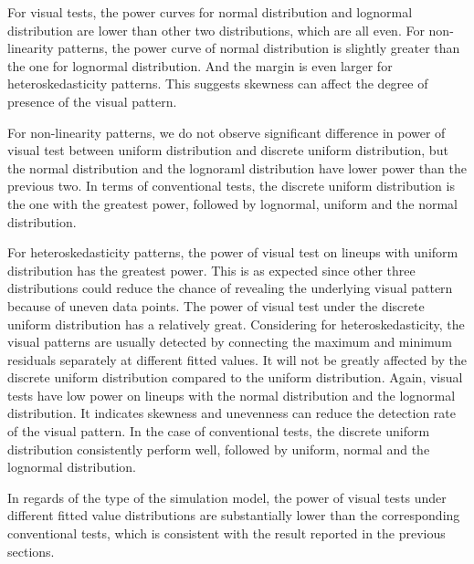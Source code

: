 \documentclass[]{interact}
\theoremstyle{plain}%
\theoremstyle{definition}
\theoremstyle{remark}
\begin{document}
For visual tests, the power curves for normal distribution and lognormal
distribution are lower than other two distributions, which are all even.
For non-linearity patterns, the power curve of normal distribution is
slightly greater than the one for lognormal distribution. And the margin
is even larger for heteroskedasticity patterns. This suggests skewness
can affect the degree of presence of the visual pattern.

For non-linearity patterns, we do not observe significant difference in
power of visual test between uniform distribution and discrete uniform
distribution, but the normal distribution and the lognoraml distribution
have lower power than the previous two. In terms of conventional tests,
the discrete uniform distribution is the one with the greatest power,
followed by lognormal, uniform and the normal distribution.

For heteroskedasticity patterns, the power of visual test on lineups
with uniform distribution has the greatest power. This is as expected
since other three distributions could reduce the chance of revealing the
underlying visual pattern because of uneven data points. The power of
visual test under the discrete uniform distribution has a relatively
great. Considering for heteroskedasticity, the visual patterns are
usually detected by connecting the maximum and minimum residuals
separately at different fitted values. It will not be greatly affected
by the discrete uniform distribution compared to the uniform
distribution. Again, visual tests have low power on lineups with the
normal distribution and the lognormal distribution. It indicates
skewness and unevenness can reduce the detection rate of the visual
pattern. In the case of conventional tests, the discrete uniform
distribution consistently perform well, followed by uniform, normal and
the lognormal distribution.

In regards of the type of the simulation model, the power of visual
tests under different fitted value distributions are substantially lower
than the corresponding conventional tests, which is consistent with the
result reported in the previous sections.
\end{document}
